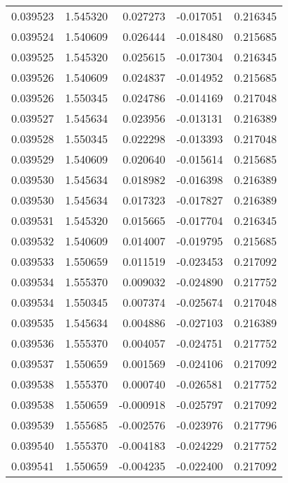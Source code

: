 \begin{tabular}{lrrrr}
0.039523    &  1.545320 &  0.027273 & -0.017051 &             0.216345 \\
0.039524    &  1.540609 &  0.026444 & -0.018480 &             0.215685 \\
0.039525    &  1.545320 &  0.025615 & -0.017304 &             0.216345 \\
0.039526    &  1.540609 &  0.024837 & -0.014952 &             0.215685 \\
0.039526    &  1.550345 &  0.024786 & -0.014169 &             0.217048 \\
0.039527    &  1.545634 &  0.023956 & -0.013131 &             0.216389 \\
0.039528    &  1.550345 &  0.022298 & -0.013393 &             0.217048 \\
0.039529    &  1.540609 &  0.020640 & -0.015614 &             0.215685 \\
0.039530    &  1.545634 &  0.018982 & -0.016398 &             0.216389 \\
0.039530    &  1.545634 &  0.017323 & -0.017827 &             0.216389 \\
0.039531    &  1.545320 &  0.015665 & -0.017704 &             0.216345 \\
0.039532    &  1.540609 &  0.014007 & -0.019795 &             0.215685 \\
0.039533    &  1.550659 &  0.011519 & -0.023453 &             0.217092 \\
0.039534    &  1.555370 &  0.009032 & -0.024890 &             0.217752 \\
0.039534    &  1.550345 &  0.007374 & -0.025674 &             0.217048 \\
0.039535    &  1.545634 &  0.004886 & -0.027103 &             0.216389 \\
0.039536    &  1.555370 &  0.004057 & -0.024751 &             0.217752 \\
0.039537    &  1.550659 &  0.001569 & -0.024106 &             0.217092 \\
0.039538    &  1.555370 &  0.000740 & -0.026581 &             0.217752 \\
0.039538    &  1.550659 & -0.000918 & -0.025797 &             0.217092 \\
0.039539    &  1.555685 & -0.002576 & -0.023976 &             0.217796 \\
0.039540    &  1.555370 & -0.004183 & -0.024229 &             0.217752 \\
0.039541    &  1.550659 & -0.004235 & -0.022400 &             0.217092 \\

\end{tabular}
